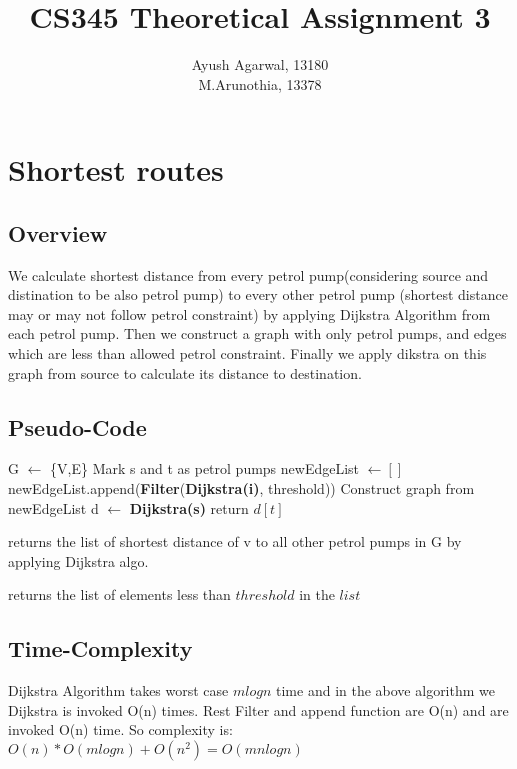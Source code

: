 \documentclass{article}
\title{CS345 Theoretical Assignment 3 \\ }
\author{\vspace{2mm} \large Ayush Agarwal, 13180 \\ M.Arunothia, 13378}
\date{}
\begin{document}
\maketitle
\tableofcontents
\newpage
\section{Shortest routes}
\subsection{Overview}
We calculate shortest distance from every petrol pump(considering source and distination to be also petrol pump) to every other petrol pump 
(shortest distance may or may not follow petrol constraint) by applying Dijkstra Algorithm from each petrol pump. Then we construct a graph
with only petrol pumps, and edges which are less than allowed petrol constraint. Finally we apply dikstra on this graph from source to calculate
its distance to destination.

\subsection{Pseudo-Code}
\begin{algorithmic}[1]
  \State G $\gets$ \{V,E\}
  \State Mark s and t as petrol pumps
  \State newEdgeList $\gets []$
  \State newEdgeList.append(\textbf{Filter}(\textbf{Dijkstra(i)}, threshold))
  \EndFor
  \State Construct graph from newEdgeList
  \State d $\gets$ \textbf{Dijkstra(s)}
  \State return $d[t]$
  \EndProcedure
\end{algorithmic} 

\vspace*{0.2cm}
\begin{algorithmic}[1]
    \State returns the list of shortest distance of v to all other petrol pumps in G by applying Dijkstra algo.
  \EndProcedure 
\end{algorithmic}

\vspace*{0.2cm}
\begin{algorithmic}[1]
    \State returns the list of elements less than $threshold$ in the $list$
    \EndProcedure 
\end{algorithmic}

\subsection{Time-Complexity}
Dijkstra Algorithm takes worst case $mlogn$ time and in the above algorithm we Dijkstra is invoked O(n) times. 
Rest Filter and append function are O(n) and are invoked O(n) time. So complexity is: \\
\hspace*{1.5cm}$O(n)*O(mlogn) + O(n^2) = O(mnlogn)$
\end{document}
